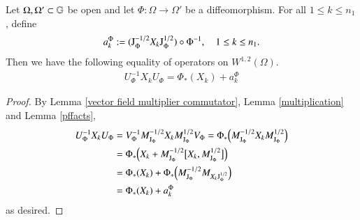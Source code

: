 \documentclass[leqno]{amsart}
\begin{document}
	\begin{lemma}\label{UXUplus}
		Let $\Omega, \Omega'\subset\mathbb{G}$ be open and let $\Phi:\Omega\to\Omega'$ be a diffeomorphism. For all $1\leq k\leq n_1$, define
		\begin{align*}
			a^{\Phi}_{k}:=(\mathrm J_{\Phi}^{-1/2} X_{k}\mathrm J_{\Phi}^{1/2})\circ\Phi^{-1},
			\quad1\leq k\leq n_{1}.
		\end{align*}
		Then we have the following equality of operators on $W^{1,2}(\Omega)$.
		\begin{align}\label{UXU-HPhi}
			U_{\Phi}^{-1}X_{k}U_{\Phi}=\Phi_*(X_{k})+a_{k}^{\Phi}
		\end{align}
		
	\end{lemma}
	\begin{proof}
		By Lemma \ref{vector field multiplier commutator}, Lemma \ref{multiplication} and  Lemma \ref{pffacts}, 
		\begin{align*}
			U_{\Phi}^{-1}X_{k}U_{\Phi}&=V_\Phi^{-1}M_{\mathrm J_{\Phi}}^{-1/2}X_k M_{\mathrm J_{\Phi}}^{1/2}V_\Phi=\Phi_*\Bigl(M_{\mathrm J_{\Phi}}^{-1/2}X_k M_{\mathrm J_{\Phi}}^{1/2}\Bigr)\\
			&=\Phi_*\Bigl(X_k+M_{\mathrm J_{\Phi}}^{-1/2}\bigl[X_k, M_{\mathrm J_{\Phi}}^{1/2}\bigr]\Bigr)\\
			&=\Phi_*(X_k)+\Phi_*\Bigl(M_{\mathrm J_{\Phi}}^{-1/2}M_{X_k\mathrm J_{\Phi}^{1/2}}\Bigr)\\
			&=\Phi_*(X_k)+a_{k}^{\Phi}
		\end{align*}
		as desired.
	\end{proof}
	
	
	
	
	
	
	
\end{document}
